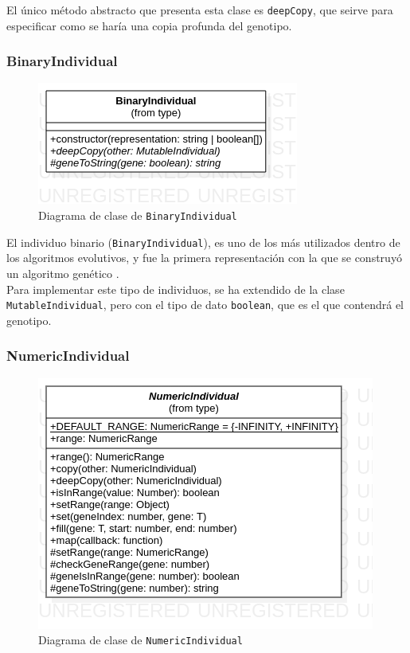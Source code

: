 El único método abstracto que presenta esta clase es \texttt{deepCopy}, que seirve para especificar como se haría una copia profunda del genotipo.

\subsubsection{BinaryIndividual}

\begin{figure}[ht]
    \centering
    \includegraphics[scale=0.7]{mem/images/cap-4/4.2.2(Individuos)/BinaryIndividual.png}
    \caption{Diagrama de clase de \texttt{BinaryIndividual}}
    \label{fig:binaryindividual-uml}
\end{figure}

El individuo binario (\texttt{BinaryIndividual}), es uno de los más utilizados dentro de los algoritmos evolutivos, y fue la primera representación con la que se construyó un algoritmo genético \cite{holland1992adaptation}. \\

Para implementar este tipo de individuos, se ha extendido de la clase \texttt{MutableIndividual}, pero con el tipo de dato \texttt{boolean}, que es el que contendrá el genotipo.

\subsubsection{NumericIndividual}

\begin{figure}[ht]
    \centering
    \includegraphics[scale=0.7]{mem/images/cap-4/4.2.2(Individuos)/NumericIndividual.png}
    \caption{Diagrama de clase de \texttt{NumericIndividual}}
    \label{fig:binaryindividual-uml}
\end{figure}

